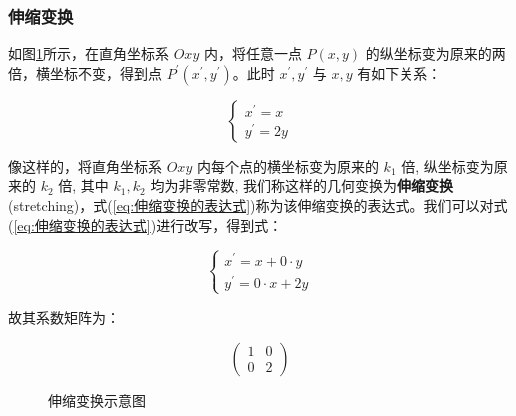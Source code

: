 \documentclass[lang=cn,newtx,10pt,scheme=chinese]{elegantbook}
\begin{document}
\subsubsection{伸缩变换}
\label{subsubsec:伸缩变换}

如图\ref{fig:伸缩变换}所示，在直角坐标系 $O x y$ 内，将任意一点 $P(x, y)$ 的纵坐标变为原来的两倍，横坐标不变，得到点 $P^{\prime}\left(x^{\prime}, y^{\prime}\right)$。此时 $x^{\prime}, y^{\prime}$ 与 $x, y$ 有如下关系：

\begin{equation}
\left\{\begin{array}{l}
x^{\prime}=x \\
y^{\prime}=2 y
\end{array}\right.
\label{eq:伸缩变换的表达式}
\end{equation}

像这样的，将直角坐标系 $O x y$ 内每个点的横坐标变为原来的 $k_1$ 倍, 纵坐标变为原来的 $k_2$ 倍, 其中 $k_1, k_2$ 均为非零常数, 我们称这样的几何变换为\textcolor{third}{\bf 伸缩变换} (stretching)，式(\ref{eq:伸缩变换的表达式})称为该伸缩变换的表达式。我们可以对式(\ref{eq:伸缩变换的表达式})进行改写，得到式：

\begin{equation}
\left\{\begin{array}{l}
x^{\prime}=x  + 0 \cdot y\\
y^{\prime}=0 \cdot x + 2 y
\end{array}\right.
\label{eq:伸缩变换的方程}
\end{equation}

故其系数矩阵为：

\begin{equation}
\left(\begin{array}{rr}
1  & 0 \\
0  & 2
\end{array}\right)
\label{eq:伸缩变换示例矩阵}
\end{equation}


\begin{figure}[h]
\centering
{}
\caption{伸缩变换示意图\label{fig:伸缩变换}}
\end{figure}
\end{document}
